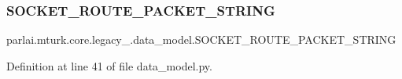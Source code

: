 \subsubsection{\texorpdfstring{S\+O\+C\+K\+E\+T\+\_\+\+R\+O\+U\+T\+E\+\_\+\+P\+A\+C\+K\+E\+T\+\_\+\+S\+T\+R\+I\+NG}{SOCKET\_ROUTE\_PACKET\_STRING}}
{\footnotesize\ttfamily parlai.\+mturk.\+core.\+legacy\+\_.\+data\+\_\+model.\+S\+O\+C\+K\+E\+T\+\_\+\+R\+O\+U\+T\+E\+\_\+\+P\+A\+C\+K\+E\+T\+\_\+\+S\+T\+R\+I\+NG}



Definition at line 41 of file data\+\_\+model.\+py.

